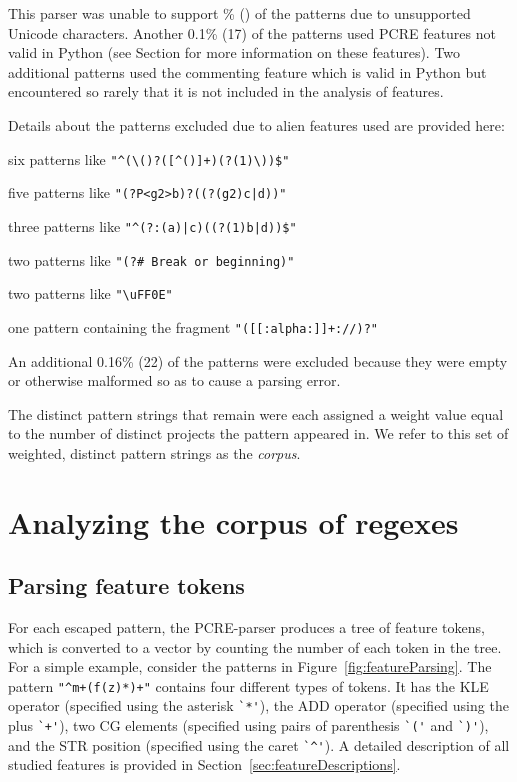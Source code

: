 This parser was unable to support \% () of the patterns due to unsupported Unicode characters.  Another 0.1\% (17) of the patterns used PCRE features not valid in Python (see Section for more information on these features).  Two additional patterns used the commenting feature which is valid in Python but encountered so rarely that it is not included in the analysis of features.

Details about the patterns excluded due to alien features used are provided here:
\begin{description} \itemsep -1pt
\item [IFC (If conditionals)] six patterns like \verb!"^(\()?([^()]+)(?(1)\))$"!
\item [NCND (Named conditions)] five patterns like \verb!"(?P<g2>b)?((?(g2)c|d))"!
\item [IFEC (If-else conditionals)] three patterns like \verb!"^(?:(a)|c)((?(1)b|d))$"!
\item [ECOM (Comments)] two patterns like \verb!"(?# Break or beginning)"!
\item [LHX (Long hex)] two patterns like \verb!"\uFF0E"!
\item [PXCC (Posix character classes)] one pattern containing the fragment \verb!"([[:alpha:]]+://)?"!
\end{description}

An additional 0.16\% (22) of the patterns were excluded because they were empty or otherwise malformed so as to cause a parsing error.

The  distinct pattern strings that remain were each assigned a weight value equal to the number of distinct projects the pattern appeared in.  We  refer to this set of weighted, distinct pattern strings as the \emph{corpus}.

\section{Analyzing the corpus of regexes}
\label{sec:corpusAnalyzing}

\subsection{Parsing feature tokens}
For each escaped pattern, the PCRE-parser produces a tree of feature tokens, which is converted to a vector by counting the number of each token in the tree.  For a simple example, consider the patterns in Figure~\ref{fig:featureParsing}.  The pattern \verb!"^m+(f(z)*)+"! contains four different types of tokens. It has the KLE operator (specified using the asterisk \verb!`*'!), the ADD operator (specified using the plus \verb!`+'!), two CG elements (specified using pairs of parenthesis \verb!`('! and \verb!`)'!), and the STR position (specified using the caret \verb!`^'!). A detailed description of all studied features is provided in Section~\ref{sec:featureDescriptions}.

